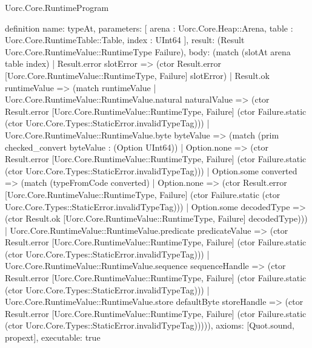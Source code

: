 \begin{lexlean}{Uorc.Core.RuntimeProgram}
\begin{semanticmodule}
definition{
  name: typeAt,
  parameters: [
    arena : Uorc.Core.Heap::Arena,
    table : Uorc.Core.RuntimeTable::Table,
    index : UInt64
  ],
  result: (Result Uorc.Core.RuntimeValue::RuntimeType Failure),
  body: (match (slotAt arena table index)
    | Result.error slotError => (ctor Result.error [Uorc.Core.RuntimeValue::RuntimeType, Failure] slotError)
    | Result.ok runtimeValue => (match runtimeValue
      | Uorc.Core.RuntimeValue::RuntimeValue.natural naturalValue => (ctor Result.error [Uorc.Core.RuntimeValue::RuntimeType, Failure] (ctor Failure.static (ctor Uorc.Core.Types::StaticError.invalidTypeTag)))
      | Uorc.Core.RuntimeValue::RuntimeValue.byte byteValue => (match (prim checked_convert byteValue : (Option UInt64))
        | Option.none => (ctor Result.error [Uorc.Core.RuntimeValue::RuntimeType, Failure] (ctor Failure.static (ctor Uorc.Core.Types::StaticError.invalidTypeTag)))
        | Option.some converted => (match (typeFromCode converted)
          | Option.none => (ctor Result.error [Uorc.Core.RuntimeValue::RuntimeType, Failure] (ctor Failure.static (ctor Uorc.Core.Types::StaticError.invalidTypeTag)))
          | Option.some decodedType => (ctor Result.ok [Uorc.Core.RuntimeValue::RuntimeType, Failure] decodedType)))
      | Uorc.Core.RuntimeValue::RuntimeValue.predicate predicateValue => (ctor Result.error [Uorc.Core.RuntimeValue::RuntimeType, Failure] (ctor Failure.static (ctor Uorc.Core.Types::StaticError.invalidTypeTag)))
      | Uorc.Core.RuntimeValue::RuntimeValue.sequence sequenceHandle => (ctor Result.error [Uorc.Core.RuntimeValue::RuntimeType, Failure] (ctor Failure.static (ctor Uorc.Core.Types::StaticError.invalidTypeTag)))
      | Uorc.Core.RuntimeValue::RuntimeValue.store defaultByte storeHandle => (ctor Result.error [Uorc.Core.RuntimeValue::RuntimeType, Failure] (ctor Failure.static (ctor Uorc.Core.Types::StaticError.invalidTypeTag))))),
  axioms: [Quot.sound, propext],
  executable: true
}


\end{semanticmodule}
\end{lexlean}
